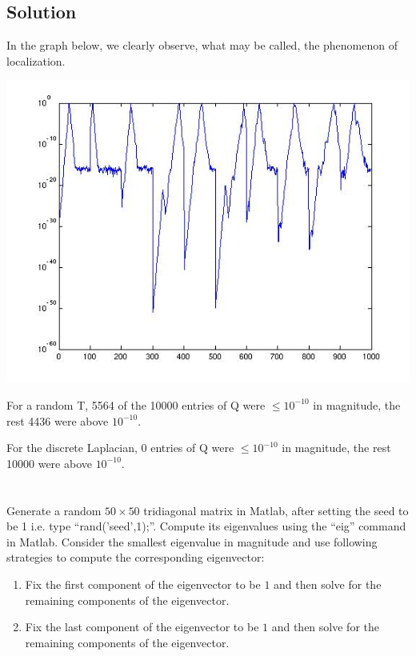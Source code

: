 \documentclass[10pt]{amsart}
\begin{document}
\subsection{Solution}
In the graph below, we clearly observe, what may be called, the phenomenon of localization.

\includegraphics{eigenvectorLocality.jpg}

For a random T, 5564 of the 10000 entries of Q were $\leq 10^{-10}$ in magnitude, the rest 4436 were above $10^{-10}$.

For the discrete Laplacian, 0 entries of Q were $\leq 10^{-10}$ in magnitude, the rest 10000 were above $10^{-10}$.

\section{}
Generate a random $50\times 50$ tridiagonal matrix in Matlab, after setting the seed to be 1 i.e. type ``rand('seed',1);''. Compute its eigenvalues using the ``eig'' command in Matlab. Consider the smallest eigenvalue in magnitude and use following strategies to compute the corresponding eigenvector:
  \begin{enumerate}
  \item Fix the first component of the eigenvector to be $1$ and then solve for the remaining components of the eigenvector.
  \item Fix the last component of the eigenvector to be $1$ and then solve for the remaining components of the eigenvector.
  \end{enumerate}
\end{document}
